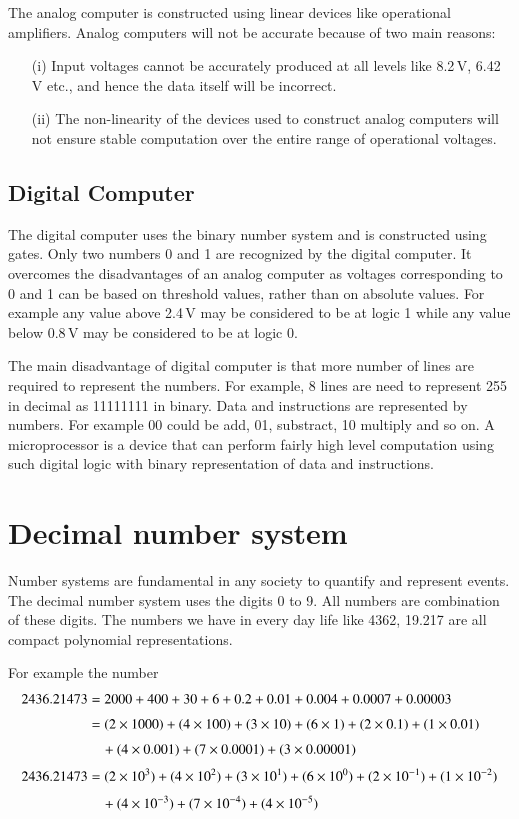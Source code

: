 The analog computer is constructed using linear devices like operational amplifiers. Analog computers will not be accurate because of two main reasons:
\begin{itemize}
\item[(i)] Input voltages cannot be accurately produced at all levels like 8.2\,V, 6.42\,V etc., and hence the data itself will be incorrect.

\item[(ii)] The non-linearity of the devices used to construct analog computers will not ensure stable computation over the entire range of operational voltages.
\end{itemize}

\subsection{Digital Computer}\label{sec6.1.2}

The digital computer uses the binary number system and is constructed using gates. Only two numbers 0 and 1 are recognized by the digital computer. It overcomes the disadvantages of an analog computer as voltages corresponding to 0 and 1 can be based on threshold values, rather than on absolute values. For example any value above 2.4\,V may be considered to be at logic 1 while any value below 0.8\,V may be considered to be at logic 0.

The main disadvantage of digital computer is that more number of lines are required to represent the numbers. For example, 8 lines are need to represent 255 in decimal as 11111111 in binary. Data and instructions are represented by numbers. For example 00 could be add, 01, substract, 10 multiply and so on. A microprocessor is a device that can perform fairly high level computation using such digital logic with binary representation of data and instructions.

\section{Decimal number system}\label{sec6.2}

Number systems are fundamental in any society to quantify and represent events. The decimal number system uses the digits 0 to 9. All numbers are combination of these digits. The numbers we have in every day life like 4362, 19.217 are all compact polynomial representations.

For example the number
\begin{align}
2436.21473 &= 2000+400+30+6+0.2+0.01+0.004+0.0007+0.00003\notag\\[3pt]
           &= (2\times 1000)+(4\times 100)+(3\times 10)+(6\times 1)+(2\times 0.1)+(1\times 0.01)\notag\\[3pt]
           &\quad +(4\times 0.001)+(7\times 0.0001)+(3\times 0.00001)\notag\\[3pt]
2436.21473 &= (2\times 10^{3})+(4\times 10^{2})+(3\times 10^{1})+(6\times 10^{0})+(2\times 10^{-1})+(1\times 10^{-2})\notag\\[3pt]
&\quad +(4\times 10^{-3})+(7\times 10^{-4})+(4\times 10^{-5})\label{eq6.1}
\end{align}

